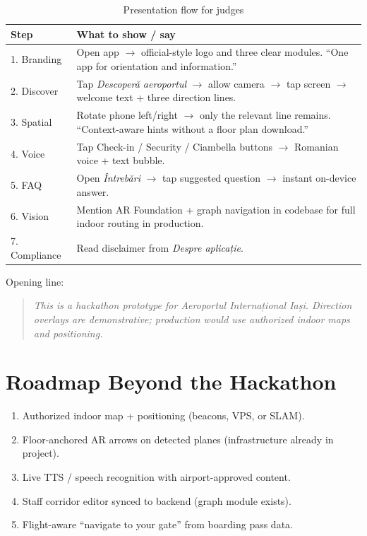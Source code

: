 \documentclass[11pt,a4paper]{article}
\begin{document}
\begin{table}[H]
\centering
\caption{Presentation flow for judges}
\label{tab:demo-flows}
\begin{tabular}{@{}p{2.5cm}p{11.1cm}@{}}
\toprule
\textbf{Step} & \textbf{What to show / say} \\
\midrule
1. Branding &
Open app $\rightarrow$ official-style logo and three clear modules. ``One app for orientation and information.'' \\
2. Discover &
Tap \emph{Descoperă aeroportul} $\rightarrow$ allow camera $\rightarrow$ tap screen $\rightarrow$ welcome text + three direction lines. \\
3. Spatial &
Rotate phone left/right $\rightarrow$ only the relevant line remains. ``Context-aware hints without a floor plan download.'' \\
4. Voice &
Tap Check-in / Security / Ciambella buttons $\rightarrow$ Romanian voice + text bubble. \\
5. FAQ &
Open \emph{Întrebări} $\rightarrow$ tap suggested question $\rightarrow$ instant on-device answer. \\
6. Vision &
Mention AR Foundation + graph navigation in codebase for full indoor routing in production. \\
7. Compliance &
Read disclaimer from \emph{Despre aplicație}. \\
\bottomrule
\end{tabular}
\end{table}

Opening line:

\begin{quote}
\textit{This is a hackathon prototype for Aeroportul Internațional Iași. Direction overlays are demonstrative; production would use authorized indoor maps and positioning.}
\end{quote}

\section{Roadmap Beyond the Hackathon}

\begin{enumerate}
    \item Authorized indoor map + positioning (beacons, VPS, or SLAM).
    \item Floor-anchored AR arrows on detected planes (infrastructure already in project).
    \item Live TTS / speech recognition with airport-approved content.
    \item Staff corridor editor synced to backend (graph module exists).
    \item Flight-aware ``navigate to your gate'' from boarding pass data.
\end{enumerate}
\end{document}
